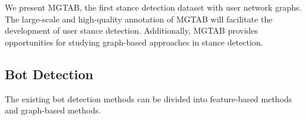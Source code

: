 \documentclass[10pt,twocolumn,letterpaper]{article}
\begin{document}
We present MGTAB, the first stance detection dataset with user network graphs. The large-scale and high-quality annotation of MGTAB will facilitate the development of user stance detection. Additionally, MGTAB provides opportunities for studying graph-based approaches in stance detection.

\begin{table}[htbp]
  \centering
\vspace{0.2cm}
\caption{Statistics about our benchmark versus existing stance detection datasets. Compared to other datasets, MGTAB explicitly provide the graph structure among users.}
\vspace{-0.4cm}
\label{tab:1}\end{table}


\subsection{Bot Detection}
The existing bot detection methods can be divided into feature-based methods and graph-based methods.
\end{document}
